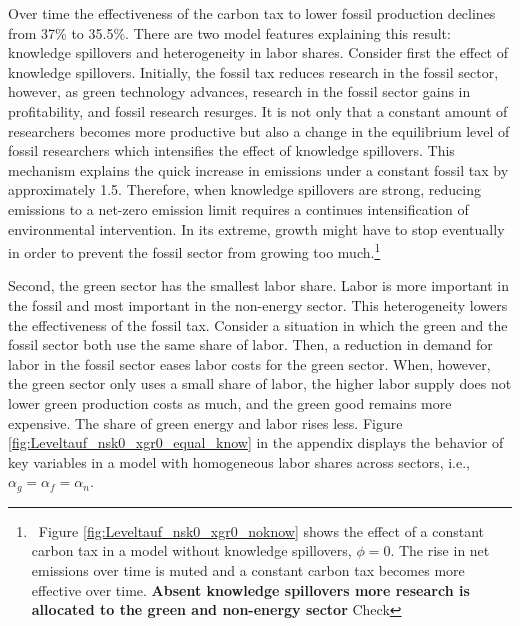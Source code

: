  Over time the effectiveness of the carbon tax to lower fossil production declines from 37\% to 35.5\%. There are two model features explaining this result: knowledge spillovers and heterogeneity in labor shares. 
 Consider first the effect of knowledge spillovers.
  Initially, the fossil tax reduces research in the fossil sector, however, as green technology advances, research in the fossil sector gains in profitability, and fossil research resurges. It is not only that a constant amount of researchers becomes more productive but also a change in the equilibrium level of fossil researchers which intensifies the effect of knowledge spillovers. This mechanism explains the quick increase in emissions under a constant fossil tax by approximately 1.5. Therefore, when knowledge spillovers are strong, reducing emissions to a net-zero emission limit requires a continues intensification of environmental intervention. In its extreme, growth might have to stop eventually in order to prevent the fossil sector from growing too much.\footnote{\ Figure \ref{fig:Leveltauf_nsk0_xgr0_noknow} shows the effect of a constant carbon tax in a model without knowledge spillovers, $\phi=0$. The rise in net emissions over time is muted and a constant carbon tax becomes more effective over time. \textbf{Absent knowledge spillovers more research is allocated to the green and non-energy sector} Check}
 
 
 Second, the green sector has the smallest labor share. Labor is more important in the fossil and most important in the non-energy sector. This heterogeneity lowers the effectiveness of the fossil tax. 
 Consider a situation in which the green and the fossil sector both use the same share of labor. Then, a reduction in demand for labor in the fossil sector eases labor costs for the green sector. When, however, the green sector only uses a small share of labor, the higher labor supply does not lower green production costs as much, and the green good remains more expensive. The share of green energy and labor rises less. Figure \ref{fig:Leveltauf_nsk0_xgr0_equal_know} in the appendix displays the behavior of key variables in a model with homogeneous labor shares across sectors, i.e., $\alpha_g=\alpha_f=\alpha_n$. 

